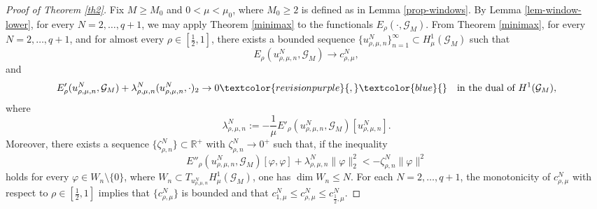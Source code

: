 \documentclass[11pt]{amsart}
\newcommand{\blue}[1]{\textcolor{blue}{#1}}
\newcommand{\purple}[1]{\textcolor{revisionpurple}{#1}}
\newcommand{\G}{\mathcal{G}}
\newcommand{\V}{\mathrm{V}}
\numberwithin{equation}{section}
\begin{document}
\begin{proof}[Proof of Theorem \ref{th2}]
Fix $M\geq M_0$ and $0<\mu<\mu_0$, where $M_0 \geq 2$ is defined as in Lemma \ref{prop-windows}. By Lemma \ref{lem-window-lower}, for every $N=2,\ldots,q+1$, we may apply Theorem \ref{minimax} to the functionals $E_\rho(\cdot,\G_M)$. 
From Theorem \ref{minimax}, for every $N=2,\ldots,q+1$, and for almost every \( \rho \in [\frac{1}{2},1] \), there exists a bounded sequence \(\{u_{\rho,\mu,n}^N\}_{n=1}^{\infty} \subset H^1_\mu(\mathcal{G}_{M})\) such that
\begin{equation}\label{5.1}
E_\rho(u_{\rho,\mu,n}^N, \mathcal{G}_M) \to c_{\rho,\mu}^N,
\end{equation}
and
\begin{equation}\label{5.2}
E'_\rho(u_{\rho,\mu,n}^N, \mathcal{G}_{M}) + \lambda_{\rho,\mu,n}^N(u_{\rho,\mu,n}^N, \cdot)_2 \to 0\purple{,}\blue{} \quad \text{in the dual of } H^1(\mathcal{G}_{M}),
\end{equation}
where
\begin{equation}\label{lagrange}
\lambda_{\rho,\mu,n}^N := -\frac{1}{\mu} E'_\rho(u_{\rho,\mu,n}^N, \mathcal{G}_{M})[u_{\rho,\mu,n}^N]. 
\end{equation}
Moreover, there exists a sequence \(\{\zeta_{\rho,n}^N\} \subset \mathbb{R}^+\) with \(\zeta_{\rho,n}^N \to 0^+\) such that, if the inequality
\begin{equation*}
E''_\rho(u_{\rho,\mu,n}^N, \mathcal{G}_M)[\varphi, \varphi] + \lambda_{\rho,\mu,n}^N  \|\varphi\|_2^2 < -\zeta_{\rho,n}^N \|\varphi\|^2 
\end{equation*}
holds for every \(\varphi\in W_n\setminus\{0\}\), where \(W_n\subset T_{u_{\rho,\mu,n}^N}H^1_\mu(\mathcal{G}_{M})\), one has \(\dim W_n\leq N\).
For each $N=2,\ldots,q+1$, the monotonicity of $c_{\rho,\mu}^N$ with respect to $\rho\in [\frac{1}{2},1]$ implies that $\{c_{\rho,\mu}^N\}$ is bounded and that $c_{1,\mu}^N\leq c_{\rho,\mu}^N \leq c_{\frac{1}{2},\mu}^N$.


\end{proof}
\end{document}

